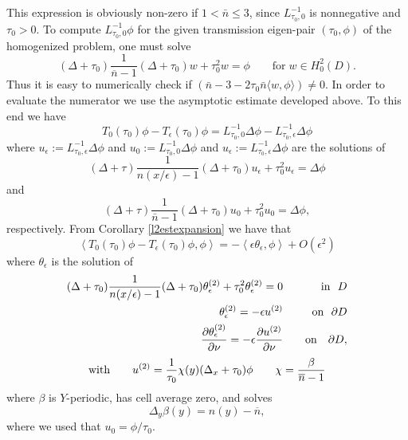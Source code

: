 \documentclass[10pt,a4paper]{amsart}
\begin{document}
This expression is obviously non-zero if $1<\bar n\leq 3$, since $L^{-1}_{\tau_0,0}$ is nonnegative and $\tau_0>0$.  To compute  $L^{-1}_{\tau_0,0}\phi$ for the given transmission eigen-pair $(\tau_0,\phi)$ of the homogenized problem, one must solve 
$$(\Delta +\tau_0 ) \frac{1}{\overline{n}-1} (\Delta +\tau_0 )w +\tau_0^2w=\phi \qquad \mbox{for}\; w\in H^2_0(D).$$
Thus it is easy to numerically check if $\left(\bar n-3  -2\tau_0\bar n \langle w,\phi\rangle\right)\neq 0$. In order to  evaluate the numerator we use the asymptotic estimate developed above.  To this end we have 
$$T_0(\tau_0)\phi-T_\epsilon(\tau_0)\phi=L_{\tau_0,0}^{-1}\Delta \phi-L_{\tau_0,\epsilon}^{-1}\Delta \phi$$
where $u_\epsilon:=L_{\tau_0,\epsilon}^{-1}\Delta \phi$  and  $u_0:=L_{\tau_0,0}^{-1}\Delta \phi$ and $u_\epsilon:=L_{\tau_0,\epsilon}^{-1}\Delta \phi$ are the solutions of 
\begin{equation*}  (\Delta +\tau) \frac{1}{n(x/\epsilon)-1}(\Delta +\tau_0) u_\epsilon +\tau_0^2 u_\epsilon= \Delta \phi \end{equation*}
and
\begin{equation*}  (\Delta +\tau) \frac{1}{\bar n-1} (\Delta +\tau_0) u_0 +\tau_0^2 u_0= \Delta \phi,
\end{equation*}
respectively.  From Corollary \ref{l2estexpansion} we have that 
\begin{equation}\label{numform}\left<T_0(\tau_0)\phi-T_\epsilon(\tau_0)\phi, \phi\right>=-\left<\epsilon\theta_\epsilon,\phi\right>+O(\epsilon^2)\end{equation}
where $\theta_\epsilon$ is the solution of 
\begin{eqnarray}   (\Delta +\tau_0) \frac{1}{n(x/\epsilon)-1} (\Delta +\tau_0) \theta_\epsilon^{(2)} +\tau_0^2\theta_\epsilon^{(2)} =  0 && \ \ \ \mbox{in}\ \ D \label{finaltheta} \\ 
\theta_\epsilon^{(2)} = -\epsilon u^{(2)} && \ \ \mbox{on}\ \ \partial D \nonumber \\ {\partial  \theta_\epsilon^{(2)} \over{\partial\nu}}= -\epsilon {\partial u^{(2)}\over{\partial\nu}} &&\ \ \ \mbox{on} \ \ \ \partial D,\nonumber\end{eqnarray}
$$ \mbox{with} \qquad u^{(2)} = \frac{1}{\tau_0}\chi(y) (\Delta_x +\tau_0) \phi   \qquad  \chi ={\beta \over{\overline{n}-1}}$$
where $\beta$ is $Y$-periodic, has cell average zero, and solves  $$\Delta_y \beta(y) = {n(y) -\overline{n}},$$ where we used that  $u_0=\phi/\tau_0$. 
\end{document}
